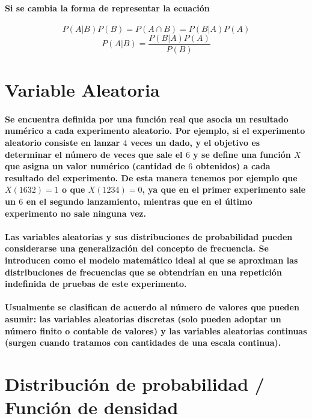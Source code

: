 \paragraph{
Si se cambia la forma de representar la ecuación
}
\begin{equation}
P(A|B)P(B)=P(A \cap B)=P(B|A)P(A)
\end{equation}
\begin{equation}
P(A|B)=\frac{P(B|A)P(A)}{P(B)}
\end{equation}



\section{Variable Aleatoria}
\paragraph{
Se encuentra definida por una función real que asocia un resultado numérico a cada experimento aleatorio. Por ejemplo, si el experimento aleatorio consiste en lanzar $4$ veces un dado, y el objetivo es determinar el número de veces que sale el $6$ y se define una función $X$ que asigna un valor numérico (cantidad de $6$ obtenidos) a cada resultado del experimento. De esta manera tenemos por ejemplo que $X(1632)=1$ o que $X(1234)=0$, ya que en el primer experimento sale un $6$ en el segundo lanzamiento, mientras que en el último experimento no sale ninguna vez.
}
\paragraph{
Las variables aleatorias y sus distribuciones de probabilidad pueden considerarse una generalización del concepto de frecuencia. Se introducen como el modelo matemático ideal al que se aproximan las distribuciones de frecuencias que se obtendrían en una repetición indefinida de pruebas de este experimento.
}
\paragraph{
Usualmente se clasifican de acuerdo al número de valores que pueden asumir: las variables aleatorias discretas (solo pueden adoptar un número finito o contable de valores) y las variables aleatorias continuas (surgen cuando tratamos con cantidades de una escala continua).
}



\section{Distribución de probabilidad / Función de densidad}
\label{sec:DistribucionDeProbabilidad}
